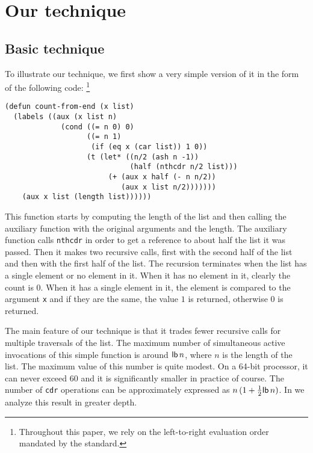 \section{Our technique}

\subsection{Basic technique}
\label{sec-basic-technique}

To illustrate our technique, we first show a very simple version of it
in the form of the following code:%
\footnote{Throughout this paper, we rely on the left-to-right
  evaluation order mandated by the \commonlisp{} standard.}

{\small
\begin{verbatim}
(defun count-from-end (x list)
  (labels ((aux (x list n)
             (cond ((= n 0) 0)
                   ((= n 1)
                    (if (eq x (car list)) 1 0))
                   (t (let* ((n/2 (ash n -1))
                             (half (nthcdr n/2 list)))
                        (+ (aux x half (- n n/2))
                           (aux x list n/2)))))))
    (aux x list (length list))))))
\end{verbatim}
}

This function starts by computing the length of the list and then
calling the auxiliary function with the original arguments and the
length.  The auxiliary function calls \texttt{nthcdr} in order to get
a reference to about half the list it was passed.  Then it makes two
recursive calls, first with the second half of the list and then with
the first half of the list.  The recursion terminates when the list has
a single element or no element in it.  When it has no element in it,
clearly the count is $0$.  When it has a single element in it, the
element is compared to the argument \texttt{x} and if they are the
same, the value $1$ is returned, otherwise $0$ is returned.

The main feature of our technique is that it trades fewer recursive
calls for multiple traversals of the list.  The maximum number of
simultaneous active invocations of this simple function is around
$\mathsf{lb}\thinspace n$, where $n$ is the length of the list.  The
maximum value of this number is quite modest.  On a 64-bit processor,
it can never exceed $60$ and it is significantly smaller in practice
of course.  
The number of \texttt{cdr} operations can be
approximately expressed as $n\thinspace (1 +
\frac{1}{2}\mathsf{lb}\thinspace n)$.  In  we
analyze this result in greater depth.

